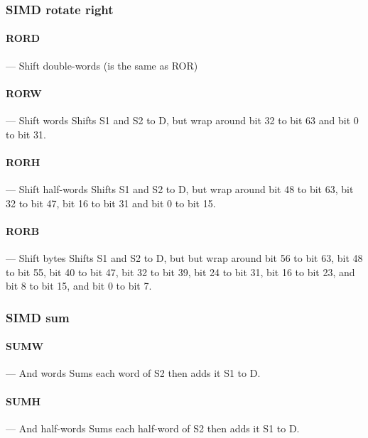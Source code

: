 \documentclass[11pt]{article}
\begin{document}
\subsubsection{SIMD rotate right}

\paragraph{RORD} --- Shift double-words (is the same as ROR)\newline

\paragraph{RORW} --- Shift words\newline
Shifts S1 and S2 to D, but wrap around bit 32 to bit 63 and bit 0 to bit 31.

\paragraph{RORH} --- Shift half-words\newline
Shifts S1 and S2 to D, but wrap around bit 48 to bit 63, bit 32 to bit 47, bit
16 to bit 31 and bit 0 to bit 15.

\paragraph{RORB} --- Shift bytes\newline
Shifts S1 and S2 to D, but but wrap around bit 56 to bit 63, bit 48 to bit 55,
bit 40 to bit 47, bit 32 to bit 39, bit 24 to bit 31, bit 16 to bit 23, and bit
8 to bit 15, and bit 0 to bit 7.

\subsubsection{SIMD sum}

\paragraph{SUMW} --- And words\newline
Sums each word of S2 then adds it S1 to D.

\paragraph{SUMH} --- And half-words\newline
Sums each half-word of S2 then adds it S1 to D.
\end{document}
